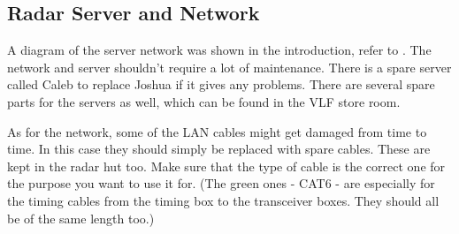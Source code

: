 \clearpage

\subsection{Radar Server and Network}
\label{subsec:hw_network}
A diagram of the server network was shown in the introduction, refer to . The network and server shouldn't require a lot of maintenance. There is a spare server called Caleb to replace Joshua if it gives any problems. There are several spare parts for the servers as well, which can be found in the VLF store room.
\par
As for the network, some of the LAN cables might get damaged from time to time. In this case they should simply be replaced with spare cables. These are kept in the radar hut too. Make sure that the type of cable is the correct one for the purpose you want to use it for. (The green ones - CAT6 - are especially for the timing cables from the timing box to the transceiver boxes. They should all be of the same length too.)

\clearpage